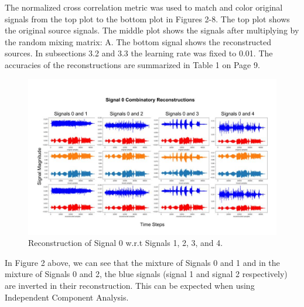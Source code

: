\documentclass[12pt]{article}
\begin{document}
\bigbreak
\noindent
The normalized cross correlation metric was used to match and color original signals from the top plot to the bottom plot in Figures 2-8. The top plot shows the original source signals. The middle plot shows the signals after multiplying by the random mixing matrix: A. The bottom signal shows the reconstructed sources. In subsections 3.2 and 3.3 the learning rate was fixed to 0.01.
\bigbreak
\noindent
The accuracies of the reconstructions are summarized in Table 1 on Page 9.

\begin{figure}[!htb] %
  \centering
  \includegraphics[width = 0.9\linewidth]{signals_0.jpg}
  \caption{Reconstruction of Signal 0 w.r.t Signals 1, 2, 3, and 4.}
\end{figure}
\FloatBarrier
\bigbreak
\noindent
In Figure 2 above, we can see that the mixture of Signals 0 and 1 and in the mixture of Signals 0 and 2, the blue signals (signal 1 and signal 2 respectively) are inverted in their reconstruction. This can be expected when using Independent Component Analysis. 
\end{document}
